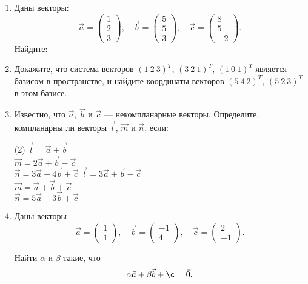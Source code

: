 \begin{enumerate}
    \item Даны векторы:
    \[
    \vec a =
    \begin{pmatrix}
    	1 \\ 2 \\ 3
    \end{pmatrix},
    \quad
    \vec b =
    \begin{pmatrix}
    	5 \\ 5 \\ 3
    \end{pmatrix},
    \quad
    \vec c = 
	\begin{pmatrix}
    	8 \\ 5 \\ -2
    \end{pmatrix}.
   \]
   Найдите:
   \begin{center}
   \end{center}
   
   \item Докажите, что система векторов
	    $(1\ 2\ 3)^T$,
	    $(3\ 2\ 1)^T$,
	    $(1\ 0\ 1)^T$
	    является базисом в пространстве, и найдите координаты векторов 
	    $(5\ 4\ 2)^T$,
	    $(5\ 2\ 3)^T$
	    в этом базисе.
	    
	\item Известно, что $\vec a$, $\vec b$ и $\vec c$ --- некомпланарные векторы. Определите, компланарны ли векторы $\vec l$, $\vec m$ и $\vec n$, если:
		\begin{tasks}(2)
	       \task $\vec l = \vec a + \vec b$\\
	      	 	 $\vec m = 2 \vec a + \vec b - \vec c$\\
	      	 	 $\vec n = 3 \vec a -4 \vec b + \vec c$
	       \task $\vec l = 3 \vec a + \vec b - \vec c$\\
	      	 	 $\vec m =  \vec a + \vec b + \vec c$\\
	      	 	 $\vec n = 5 \vec a +3 \vec b + \vec c$
	    \end{tasks}
	    
	\item Даны векторы
	$$\vec a = \begin{pmatrix}
	    	1 \\ 1
	    \end{pmatrix},\quad
	   \vec b = \begin{pmatrix}
	    	-1 \\ 4
	    \end{pmatrix},\quad
	    \vec c = \begin{pmatrix}
	    	2 \\ -1
	    \end{pmatrix}.$$
	  
	 Найти $\alpha$ и $\beta$ такие, что
	 $$\alpha \vec a + \beta \vec b + \c = \vec 0.$$
	    

\end{enumerate}